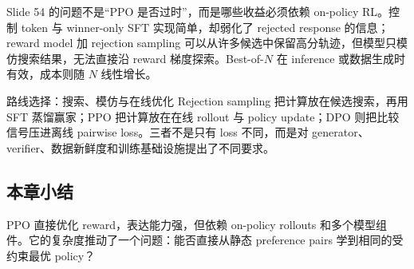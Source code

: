 
Slide 54 的问题不是“PPO 是否过时”，而是哪些收益必须依赖 on-policy RL。控制 token 与 winner-only SFT 实现简单，却弱化了 rejected response 的信息；reward model 加 rejection sampling 可以从许多候选中保留高分轨迹，但模型只模仿搜索结果，无法直接沿 reward 梯度探索。Best-of-$N$ 在 inference 或数据生成时有效，成本则随 $N$ 线性增长。

\begin{knowledgebox}{路线选择：搜索、模仿与在线优化}
Rejection sampling 把计算放在候选搜索，再用 SFT 蒸馏赢家；PPO 把计算放在在线 rollout 与 policy update；DPO 则把比较信号压进离线 pairwise loss。三者不是只有 loss 不同，而是对 generator、verifier、数据新鲜度和训练基础设施提出了不同要求。
\end{knowledgebox}

\subsection{本章小结}

PPO 直接优化 reward，表达能力强，但依赖 on-policy rollouts 和多个模型组件。它的复杂度推动了一个问题：能否直接从静态 preference pairs 学到相同的受约束最优 policy？

